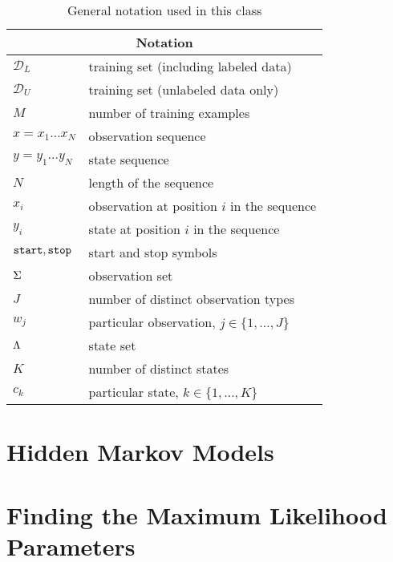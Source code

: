 \begin{table}[h]
\begin{center}
\begin{tabular}{|l|l|}
\hline
\multicolumn{2}{|c|}{Notation}\\
\hline
\hline
$\mathcal{D}_L$ & training set (including labeled data)\\
\hline
$\mathcal{D}_U$ & training set (unlabeled data only)\\
\hline
$M$  & number of training examples \\
\hline
$x = x_1 \ldots x_N$  & observation sequence \\
\hline
$y = y_1 \ldots y_N$  & state sequence \\
\hline
$N$  & length of the sequence \\
\hline
$x_i$ &  observation at position $i$ in the sequence\\
\hline
$y_i$ &  state at position $i$ in the sequence\\
\hline
${\tt start}, {\tt stop}$ & start and stop symbols\\
\hline
$\Sigma$ & observation set\\
\hline 
$J$ & number of distinct observation types\\
\hline 
$w_j$ & particular observation, $j \in \{1,\ldots,J\}$\\
\hline 
$\Lambda$ & state set\\
\hline 
$K$ & number of distinct states\\
\hline 
$c_k$ & particular state, $k \in \{1,\ldots,K\}$\\
\hline  
\end{tabular}
\end{center}
\label{tab:hmm_notation}
\caption{General notation used in this class}
\end{table}








\section{\label{hmm} Hidden Markov Models}






\section{\label{ml} Finding the Maximum Likelihood Parameters}




